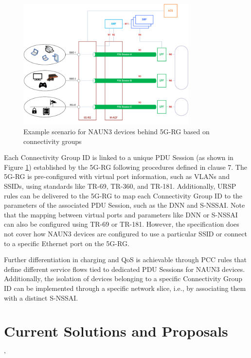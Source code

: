 \begin{figure}[htbp]
    \centering
    \includegraphics[width=0.8\textwidth]{figs/Example scenario for NAUN3 devices behind 5G-RG based on connectivity groups.png}
    \caption{Example scenario for NAUN3 devices behind 5G-RG based on connectivity groups}
    \label{fig:naun3-bhd-5grg}
\end{figure}

Each \ac{Connectivity Group ID} is linked to a unique \ac{PDU Session} (as shown in Figure \ref{fig:naun3-bhd-5grg}) established by the \ac{5G-RG} following procedures defined in clause 7. The \ac{5G-RG} is pre-configured with virtual port information, such as \ac{VLAN}s and \ac{SSID}s, using standards like \ac{TR}-69, \ac{TR}-360, and \ac{TR}-181. Additionally, \ac{URSP} rules can be delivered to the \ac{5G-RG} to map each \ac{Connectivity Group ID} to the parameters of the associated \ac{PDU Session}, such as the \ac{DNN} and \ac{S-NSSAI}. Note that the mapping between virtual ports and parameters like \ac{DNN} or \ac{S-NSSAI} can also be configured using \ac{TR}-69 or \ac{TR}-181. However, the specification does not cover how \ac{NAUN3} devices are configured to use a particular \ac{SSID} or connect to a specific Ethernet port on the \ac{5G-RG}.

Further differentiation in charging and \ac{QoS} is achievable through \ac{PCC} rules that define different service flows tied to dedicated \ac{PDU Sessions} for \ac{NAUN3} devices. Additionally, the isolation of devices belonging to a specific \ac{Connectivity Group ID} can be implemented through a specific network slice, i.e., by associating them with a distinct \ac{S-NSSAI}.



\section{Current Solutions and Proposals}'